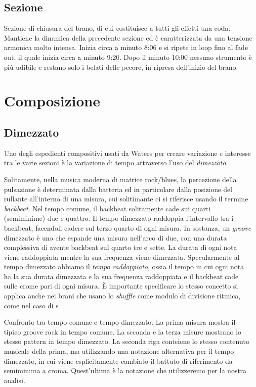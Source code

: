 \documentclass[class=book, crop=false, oneside, 12pt]{standalone}
\begin{document}
    
    \subsection{Sezione }
    Sezione di chiusura del brano, di cui costituisce a tutti gli effetti una coda. Mantiene la dinamica della precedente sezione ed è caratterizzata da una tensione armonica molto intensa. Inizia circa a minuto 8:06 e si ripete in loop fino al fade out, il quale inizia circa a minuto 9:20. Dopo il minuto 10:00 nessuno strumento è più udibile e restano solo i belati delle pecore, in ripresa dell'inizio del brano.
    
    \section{Composizione}
    \label{sec:03-arrangement}

    \subsection{Dimezzato}
    Uno degli espedienti compositivi usati da Waters per creare variazione e interesse tra le varie sezioni è la variazione di tempo attraverso l'uso del \emph{dimezzato}. 

    Solitamente, nella musica moderna di matrice rock/blues, la percezione della pulsazione  è determinata dalla batteria ed in particolare dalla posizione del rullante all'interno di una misura, cui solitimante ci si riferisce usando il termine \emph{backbeat}. Nel tempo comune, il backbeat solitamente cade  sui quarti (semiminime) due e quattro. Il tempo dimezzato raddoppia l'intervallo tra i backbeat, facendoli cadere sul terzo quarto di ogni misura. In sostanza, un \emph{groove} dimezzato è uno che espande una misura nell'arco di due, con una durata complessiva di  avente backbeat sul quarto tre e sette. La durata di ogni nota viene raddoppiata mentre la sua frequenza viene dimezzata. Specularmente al tempo dimezzato abbiamo il \emph{tempo raddoppiato}, ossia il tempo in cui ogni nota ha la sua durata dimezzata e la sua frequenza raddoppiata e il backbeat cade sulle crome pari di ogni misura. È importante specificare lo stesso concetto si applica anche nei brani che usano lo \emph{shuffle} come modulo di divisione ritmica, come nel caso di \acrshort{s}~\cite{randel2003harvard}.

    \begin{sheet}[htb]
        \centering
        \caption[Confronto tra tempo comune e tempo dimezzato.]{Confronto tra tempo comune e tempo dimezzato. La prima misura mostra il tipico groove rock in tempo comune. La seconda e la terza misure mostrano lo stesso pattern in tempo dimezzato. La seconda riga conteiene lo stesso contenuto musicale della prima, ma utilizzando una notazione alternativa per il tempo dimezzato, in cui viene esplicitamente cambiato il battuto di riferimento da semiminima a croma. Quest'ultima è la notazione che utilizzeremo per la nostra analisi.}
        \label{sheet:common-vs-half-time}
    \end{sheet}
\end{document}
